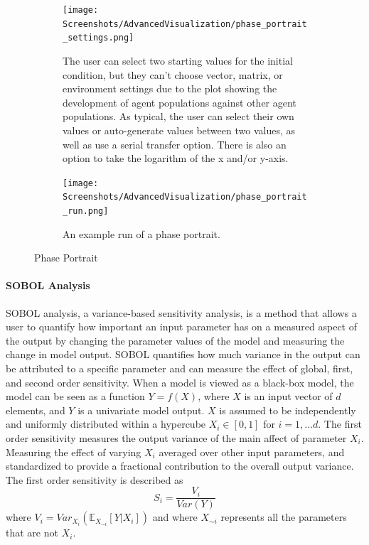 \begin{figure}[!ht]
    \centering
    \begin{subfigure}{0.49\linewidth}
        \centering
        \captionsetup{width=1\linewidth}
        \texttt{[image: Screenshots/AdvancedVisualization/phase\_portrait\_settings.png]}
        \caption{
            The user can select two starting values for the initial condition, but they can't choose vector, matrix, or environment settings due to the plot showing the development of agent populations against other agent populations.
            As typical, the user can select their own values or auto-generate values between two values, as well as use a serial transfer option.
            There is also an option to take the logarithm of the x and/or y-axis. 
        }
        \label{fig:ss:av:phase_portrait_settings}
    \end{subfigure}
    \hfill
    \begin{subfigure}{0.49\linewidth}
        \centering
        \captionsetup{width=1\linewidth}
        \texttt{[image: Screenshots/AdvancedVisualization/phase\_portrait\_run.png]}
        \caption{
            An example run of a phase portrait.
        }
        \label{fig:ss:av:phase_portrait_run}
    \end{subfigure}
    \caption{Phase Portrait}
\end{figure}

\paragraph{SOBOL Analysis}
\label{sec:SOBOL_analysis}
SOBOL analysis, a variance-based sensitivity analysis, is a method that allows a user to quantify how important an input parameter has on a measured aspect of the output by changing the parameter values of the model and measuring the change in model output.
SOBOL quantifies how much variance in the output can be attributed to a specific parameter and can measure the effect of global, first, and second order sensitivity. 
When a model is viewed as a black-box model, the model can be seen as a function $Y=f(X)$, where $X$ is an input vector of $d$ elements, and $Y$ is a univariate model output.
$X$ is assumed to be independently and uniformly distributed within a hypercube $X_i \in [0, 1]$ for $i=1, \dots d$.
The first order sensitivity measures the output variance of the main affect of parameter $X_i$.
Measuring the effect of varying $X_i$ averaged over other input parameters, and standardized to provide a fractional contribution to the overall output variance.
The first order sensitivity is described as
\[
    S_i = \frac{V_i}{\textit{Var}(Y)}
\] where $V_i = \textit{Var}_{X_i}(\mathbb{E}_{X_{\sim i}}[Y|X_i])$ and where $X_{\sim i}$ represents all the parameters that are not $X_i$.


